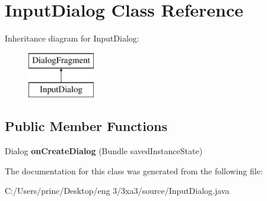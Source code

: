 \hypertarget{class_input_dialog}{}\section{Input\+Dialog Class Reference}
\label{class_input_dialog}
Inheritance diagram for Input\+Dialog\+:\begin{figure}[H]
\begin{center}
\leavevmode
\includegraphics[height=2.000000cm]{class_input_dialog}
\end{center}
\end{figure}
\subsection*{Public Member Functions}
\begin{DoxyCompactItemize}
\item 
\mbox{\label{class_input_dialog_aa06cb49e861ad7107a234cd79fc5e9da}} 
Dialog {\bfseries on\+Create\+Dialog} (Bundle saved\+Instance\+State)
\end{DoxyCompactItemize}


The documentation for this class was generated from the following file\+:\begin{DoxyCompactItemize}
\item 
C\+:/\+Users/princ/\+Desktop/eng 3/3xa3/source/Input\+Dialog.\+java\end{DoxyCompactItemize}
